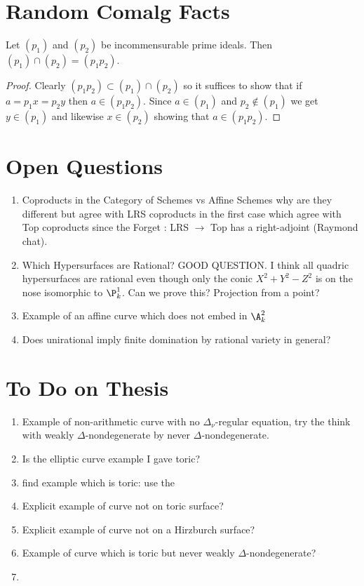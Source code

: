 \documentclass[12pt]{article}
\begin{document}
\section{Random Comalg Facts}

\begin{lemma}
Let $(p_1)$ and $(p_2)$ be incommensurable prime ideals. Then $(p_1) \cap (p_2) = (p_1 p_2)$.
\end{lemma}

\begin{proof}
Clearly $(p_1 p_2) \subset (p_1) \cap (p_2)$ so it suffices to show that if $a = p_1 x = p_2 y$ then $a \in (p_1 p_2)$. Since $a \in (p_1)$ and $p_2 \notin (p_1)$ we get $y \in (p_1)$ and likewise $x \in (p_2)$ showing that $a \in (p_1 p_2)$. 
\end{proof}

\section{Open Questions}

\begin{enumerate}
\item Coproducts in the Category of Schemes vs Affine Schemes why are they different but agree with LRS coproducts in the first case which agree with Top coproducts since the Forget : LRS $\to$ Top has a right-adjoint (Raymond chat).
\item Which Hypersurfaces are Rational?  GOOD QUESTION. I think all quadric hypersurfaces are rational even though only the conic $X^2 + Y^2 - Z^2$ is on the nose isomorphic to $\P^1_k$. Can we prove this? Projection from a point?
\item Example of an affine curve which does not embed in $\A^2_k$
\item Does unirational imply finite domination by rational variety in general?
\end{enumerate}

\section{To Do on Thesis}

\begin{enumerate}
\item Example of non-arithmetic curve with no $\Delta_{\nu}$-regular equation, try the think with weakly $\Delta$-nondegenerate by never $\Delta$-nondegenerate.
\item Is the elliptic curve example I gave toric?
\item find example which is toric: use the 
\item Explicit example of curve not on toric surface?
\item Explicit example of curve not on a Hirzburch surface?
\item Example of curve which is toric but never weakly $\Delta$-nondegenerate?
\item 
\end{enumerate}
\end{document}
